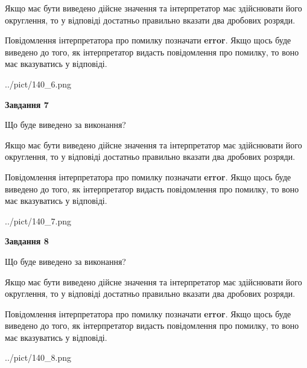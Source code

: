 \documentclass[12pt, ukrainian]{article}
\begin{document}
{\begin {Large}
Якщо має бути виведено дійсне значення та інтерпретатор має здійснювати його округлення, 
то у відповіді достатньо правильно вказати два дробових розряди.

Повідомлення інтерпретатора про помилку позначати \textbf{error}.
Якщо щось буде виведено до того, як інтерпретатор видасть повідомлення про помилку, 
то воно має вказуватись у відповіді. \par

\begin{center}
	{../pict/140_6.png}
\end{center}
\newpage

{\begin {center}\textbf{Завдання 7}\end {center}}\par
Що буде виведено за виконання? \par

Якщо має бути виведено дійсне значення та інтерпретатор має здійснювати його округлення, 
то у відповіді достатньо правильно вказати два дробових розряди.

Повідомлення інтерпретатора про помилку позначати \textbf{error}.
Якщо щось буде виведено до того, як інтерпретатор видасть повідомлення про помилку, 
то воно має вказуватись у відповіді. \par

\begin{center}
	{../pict/140_7.png}
\end{center}
\newpage

{\begin {center}\textbf{Завдання 8}\end {center}}\par
Що буде виведено за виконання? \par

Якщо має бути виведено дійсне значення та інтерпретатор має здійснювати його округлення, 
то у відповіді достатньо правильно вказати два дробових розряди.

Повідомлення інтерпретатора про помилку позначати \textbf{error}.
Якщо щось буде виведено до того, як інтерпретатор видасть повідомлення про помилку, 
то воно має вказуватись у відповіді. \par

\begin{center}
	{../pict/140_8.png}
\end{center}
\newpage


\end{Large}}
\end{document}
